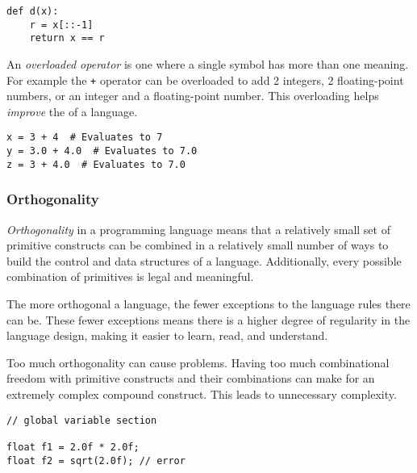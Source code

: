 \begin{verbatim}
def d(x):
    r = x[::-1]
    return x == r
\end{verbatim}

\begin{definition}\label{def:Overload_Operator}
  An \emph{overloaded operator} is one where a single symbol has more than one meaning.
  For example the \texttt{+} operator can be overloaded to add 2 integers, 2 floating-point numbers, or an integer and a floating-point number.
  This overloading helps \emph{improve} the  of a language.
\end{definition}

\begin{verbatim}
x = 3 + 4  # Evaluates to 7
y = 3.0 + 4.0  # Evaluates to 7.0
z = 3 + 4.0  # Evaluates to 7.0
\end{verbatim}

\subsubsection{Orthogonality}\label{subsubsec:Orthogonality}
\begin{definition}[Orthogonality]\label{def:Orthogonality}
  \emph{Orthogonality} in a programming language means that a relatively small set of primitive constructs can be combined in a relatively small number of ways to build the control and data structures of a language.
  Additionally, every possible combination of primitives is legal and meaningful.

  The more orthogonal a language, the fewer exceptions to the language rules there can be.
  These fewer exceptions means there is a higher degree of regularity in the language design, making it easier to learn, read, and understand.

  \begin{remark}\label{rmk:Over_Orthogonality}
    Too much orthogonality can cause problems.
    Having too much combinational freedom with primitive constructs and their combinations can make for an extremely complex compound construct.
    This leads to unnecessary complexity.
  \end{remark}
\end{definition}

\begin{verbatim}
// global variable section

float f1 = 2.0f * 2.0f;
float f2 = sqrt(2.0f); // error
\end{verbatim}

